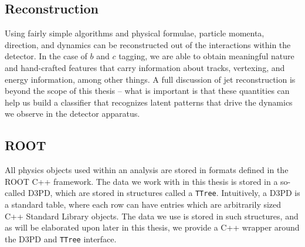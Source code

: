 \subsection{Reconstruction}

Using fairly simple algorithms and physical formulae, particle momenta, direction, and dynamics can be reconstructed out of the interactions within the detector. In the case of $b$ and $c$ tagging, we are able to obtain meaningful nature and hand-crafted features that carry information about tracks, vertexing, and energy information, among other things. A full discussion of jet reconstruction is beyond the scope of this thesis -- what is important is that these quantities can help us build a classifier that recognizes latent patterns that drive the dynamics we observe in the detector apparatus.

\subsection{ROOT}

All physics objects used within an analysis are stored in formats defined in the ROOT \citep{ROOT} C++ framework. The data we work with in this thesis is stored in a so-called D3PD, which are stored in structures called a \texttt{TTree}. Intuitively, a D3PD is a standard table, where each row can have entries which are arbitrarily sized C++ Standard Library objects. The data we use is stored in such structures, and as will be elaborated upon later in this thesis, we provide a C++ wrapper around the D3PD and \texttt{TTree} interface.


